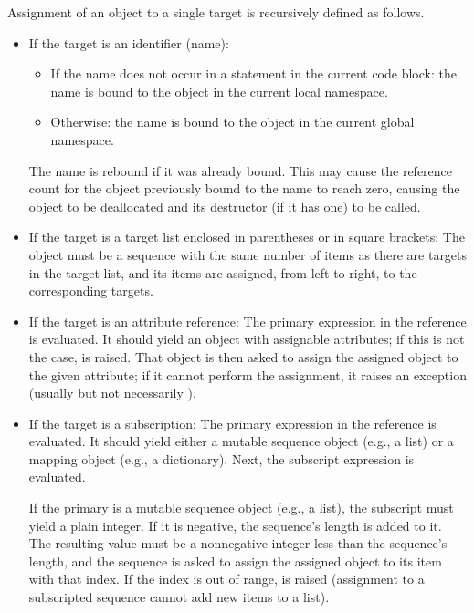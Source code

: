 Assignment of an object to a single target is recursively defined as
follows.

\begin{itemize} %

\item
If the target is an identifier (name):

\begin{itemize}

\item
If the name does not occur in a  statement in the current
code block: the name is bound to the object in the current local
namespace.

\item
Otherwise: the name is bound to the object in the current global
namespace.

\end{itemize} %

The name is rebound if it was already bound.  This may cause the
reference count for the object previously bound to the name to reach
zero, causing the object to be deallocated and its
destructor (if it has one) to be called.

\item
If the target is a target list enclosed in parentheses or in square
brackets: The object must be a sequence with the same number of items
as there are targets in the target list, and its items are assigned,
from left to right, to the corresponding targets.

\item
If the target is an attribute reference: The primary expression in the
reference is evaluated.  It should yield an object with assignable
attributes; if this is not the case,  is raised.  That
object is then asked to assign the assigned object to the given
attribute; if it cannot perform the assignment, it raises an exception
(usually but not necessarily ).

\item
If the target is a subscription: The primary expression in the
reference is evaluated.  It should yield either a mutable sequence
object (e.g., a list) or a mapping object (e.g., a dictionary).  Next,
the subscript expression is evaluated.

If the primary is a mutable sequence object (e.g., a list), the subscript
must yield a plain integer.  If it is negative, the sequence's length
is added to it.  The resulting value must be a nonnegative integer
less than the sequence's length, and the sequence is asked to assign
the assigned object to its item with that index.  If the index is out
of range,  is raised (assignment to a subscripted
sequence cannot add new items to a list).


\end{itemize}
